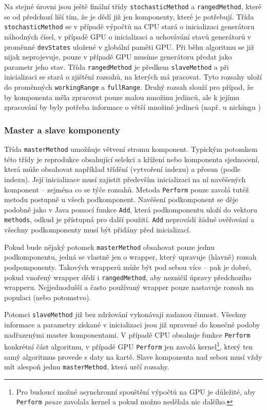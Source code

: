 Na stejné úrovni jsou ještě finální třídy \texttt{stochasticMethod} a \texttt{rangedMethod}, které se od předchozí liší tím, že je dědí již jen komponenty, které je potřebují. Třída \texttt{stochasticMethod} se v případě výpočtů na CPU stará o inicializaci generátoru náhodných čísel, v případě GPU o inicializaci a uchovávání stavů generátorů v proměnné \texttt{devStates} uložené v globální paměti GPU. Při běhu algoritmu se již nijak neprojevuje, pouze v případě GPU musíme generátoru předat jako parametr jeho stav. Třída \texttt{rangedMethod} je předkem \texttt{slaveMethod} a při inicializaci se stará o zjištění rozsahů, na kterých má pracovat. Tyto rozsahy uloží do proměnných \texttt{workingRange} a \texttt{fullRange}. Druhý rozsah slouží pro případ, že by komponenta měla zpracovat pouze malou množinu jedinců, ale k jejímu zpracování by byly potřeba informace o větší množině jedinců (např. u nichingu )

\subsubsection{Master a slave komponenty}

Třída \texttt{masterMethod} umožňuje větvení stromu komponent. Typickým potomkem této třídy je reprodukce obsahující selekci a křížení nebo komponenta sjednocení, která může obsahovat například třídění (vytvoření indexu) a přesun (podle indexu). Její inicializace musí zajistit především inicializaci na ní navěšených komponent -- zejména co se týče rozsahů. Metoda \texttt{Perform} pouze zavolá tutéž metodu postupně u všech podkomponent. Navěšení podkomponent se děje podobně jako v Java pomocí funkce \texttt{Add}, která podkomponentu uloží do vektoru \texttt{methods}, odkud je přístupná pro další použití. \texttt{Add} neprovádí žádné ověřování a všechny podkomponenty musí být přidány před inicializací.

Pokud bude nějaký potomek \texttt{masterMethod} obsahovat pouze jednu podkomponentu, jedná se vlastně jen o wrapper, který upravuje (hlavně) rozsah podpomponenty. Takových wrapperů může být pod sebou více -- pak je dobré, pokud vnořený wrapper dědí i \texttt{rangedMethod}, aby nezničil úpravy předchozího wrapperu. Nejjednodušší a často používaný wrapper pouze nastavuje rozsah na populaci (nebo potomstvo).\vspace{0.2cm}

Potomci \texttt{slaveMethod} již bez zdržování vykonávají zadanou činnost. Všechny informace a parametry získané v inicializaci jsou již upravené do konečné podoby nadřazenými master komponentami. V případě CPU obsahuje funkce \texttt{Perform} konkrétní část algoritmu, v případě GPU \texttt{Perform} jen zavolá kernel\footnote{Pro budoucí možné asynchronní spouštění výpočtů na GPU je důležité, aby \texttt{Perform} \emph{pouze} zavolala kernel a pokud možno nedělala nic dalšího.}, který ten samý algoritmus provede s daty na kartě. Slave komponenta nad sebou musí vždy mít alespoň jednu \texttt{masterMethod}, která určí rozsahy.

